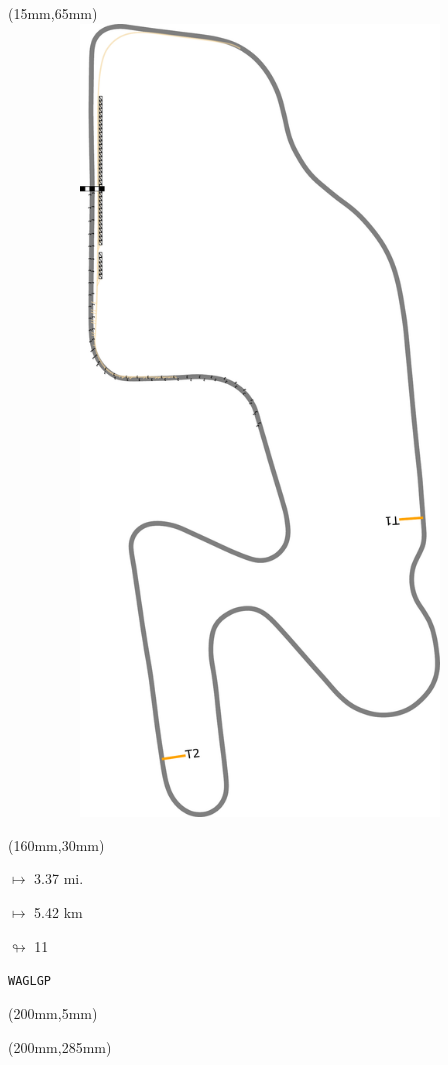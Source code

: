\begin{textblock*}{185mm}(15mm,65mm)%
\centering
\mbox{\includegraphics[width=185mm,height=210mm,keepaspectratio]{PT/WAGLGP.pdf}}
\end{textblock*}
\begin{textblock*}{40mm}(160mm,30mm)%
\Large
\par$\mapsto$ 3.37 mi.
\par$\mapsto$ 5.42 km
\par$\looparrowright$ 11
\par\hfill\tiny\tt WAGLGP\\
\end{textblock*}
\begin{textblock*}{20mm}(200mm,5mm)%
\fbox{\thepage}
\label{WAGLGP}
\end{textblock*}
\begin{textblock*}{20mm}(200mm,285mm)%
\fbox{\thepage}
\end{textblock*}

